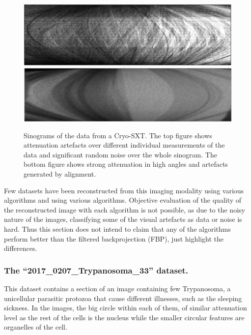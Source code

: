 \begin{figure}
\begin{center}

\includegraphics[width=\textwidth]{Applications/sinobad.png} 
\includegraphics[width=\textwidth]{Applications/sinogrammod.png} 

\end{center}

\caption[Sinograms of the data from a Cryo-SXT]{\label{fig:Cryo-SXT} Sinograms of the data from a Cryo-SXT. The top figure shows attenuation artefacts over different individual measurements of the data and significant random noise over the whole sinogram. The bottom figure shows strong attenuation in high angles and artefacts generated by alignment. } 
\end{figure}




Few datasets have been reconstructed from this imaging modality using various algorithms and using various algorithms. Objective evaluation of the quality of the reconstructed image with each algorithm is not possible, as due to the noisy nature of the images, classifying some of the visual artefacts as data or noise is hard. Thus this section does not intend to claim that any of the algorithms perform better than the filtered backprojection (FBP), just highlight the differences.

\subsubsection{The ``2017\_0207\_Trypanosoma\_33'' dataset.} This dataset contains a section of an image containing few Trypanosoma, a unicellular parasitic protozoa that cause different illnesses, such as the sleeping sickness. In the images, the big circle within each of them, of similar attenuation level as the rest of the cells is the nucleus while the smaller circular features are organelles of the cell.

